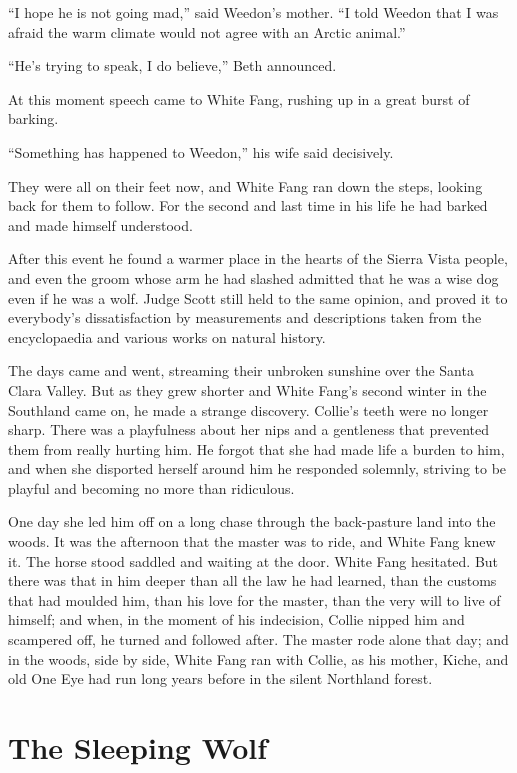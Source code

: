 \documentclass[10pt]{book}
\begin{document}
“I hope he is not going mad,” said Weedon’s mother. “I told Weedon that
I was afraid the warm climate would not agree with an Arctic animal.”

“He’s trying to speak, I do believe,” Beth announced.

At this moment speech came to White Fang, rushing up in a great burst
of barking.

“Something has happened to Weedon,” his wife said decisively.

They were all on their feet now, and White Fang ran down the steps,
looking back for them to follow. For the second and last time in his
life he had barked and made himself understood.

After this event he found a warmer place in the hearts of the Sierra
Vista people, and even the groom whose arm he had slashed admitted that
he was a wise dog even if he was a wolf. Judge Scott still held to the
same opinion, and proved it to everybody’s dissatisfaction by
measurements and descriptions taken from the encyclopaedia and various
works on natural history.

The days came and went, streaming their unbroken sunshine over the
Santa Clara Valley. But as they grew shorter and White Fang’s second
winter in the Southland came on, he made a strange discovery. Collie’s
teeth were no longer sharp. There was a playfulness about her nips and
a gentleness that prevented them from really hurting him. He forgot
that she had made life a burden to him, and when she disported herself
around him he responded solemnly, striving to be playful and becoming
no more than ridiculous.

One day she led him off on a long chase through the back-pasture land
into the woods. It was the afternoon that the master was to ride, and
White Fang knew it. The horse stood saddled and waiting at the door.
White Fang hesitated. But there was that in him deeper than all the law
he had learned, than the customs that had moulded him, than his love
for the master, than the very will to live of himself; and when, in the
moment of his indecision, Collie nipped him and scampered off, he
turned and followed after. The master rode alone that day; and in the
woods, side by side, White Fang ran with Collie, as his mother, Kiche,
and old One Eye had run long years before in the silent Northland
forest.

\chapter{The Sleeping Wolf}
\end{document}
